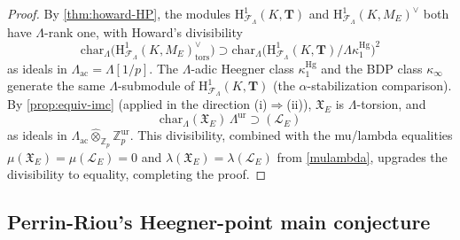\begin{proof}
  By \cref{thm:howard-HP}, the modules $\mathrm{H}^1_{\mathcal{F}_\Lambda}(K, \mathbf{T})$
  and $\mathrm{H}^1_{\mathcal{F}_\Lambda}(K, M_E)^\vee$ both have $\Lambda$-rank one, with
  Howard's divisibility
  \[
    \mathrm{char}_\Lambda\!\bigl(\mathrm{H}^1_{\mathcal{F}_\Lambda}(K,M_E)^\vee_{\mathrm{tors}}\bigr)
    \supset
    \mathrm{char}_\Lambda\!\bigl(\mathrm{H}^1_{\mathcal{F}_\Lambda}(K,\mathbf{T})/\Lambda\kappa_1^{\mathrm{Hg}}\bigr)^2
  \]
  as ideals in $\Lambda_{\mathrm{ac}} = \Lambda[1/p]$.
  The $\Lambda$-adic Heegner class $\kappa_1^{\mathrm{Hg}}$ and the BDP class
  $\kappa_\infty$ generate the same $\Lambda$-submodule of
  $\mathrm{H}^1_{\mathcal{F}_\Lambda}(K, \mathbf{T})$ (the $\alpha$-stabilization
  comparison). By \cref{prop:equiv-imc} (applied in the direction (i)$\Rightarrow$(ii)),
  $\mathfrak{X}_E$ is $\Lambda$-torsion, and
  \[
    \mathrm{char}_\Lambda(\mathfrak{X}_E)\,\Lambda^{\mathrm{ur}} \supset (\mathcal{L}_E)
  \]
  as ideals in $\Lambda_{\mathrm{ac}} \widehat{\otimes}_{\mathbb{Z}_p} \mathbb{Z}_p^{\mathrm{ur}}$.
  This divisibility, combined with the mu/lambda equalities
  $\mu(\mathfrak{X}_E) = \mu(\mathcal{L}_E) = 0$ and
  $\lambda(\mathfrak{X}_E) = \lambda(\mathcal{L}_E)$ from \cref{mulambda},
  upgrades the divisibility to equality, completing the proof.
\end{proof}

\subsection{Perrin-Riou's Heegner-point main conjecture}

